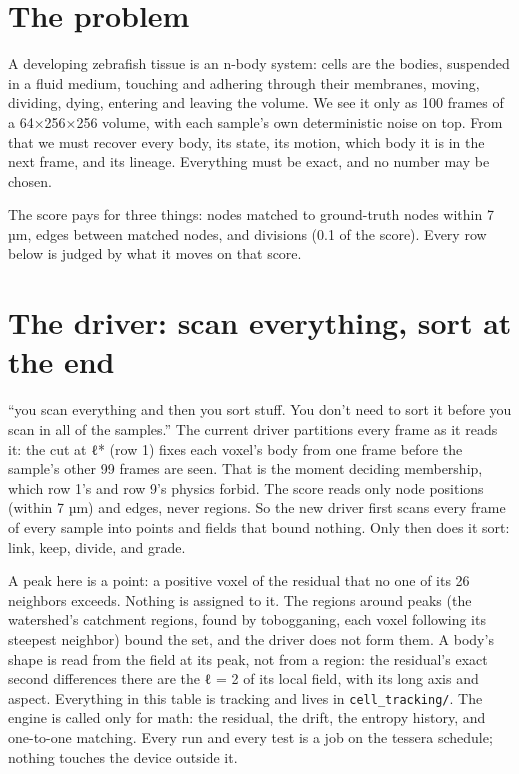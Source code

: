 \section{\texorpdfstring{The problem}{The problem}}

A developing zebrafish tissue is an n-body system: cells are the bodies, suspended in a fluid medium, touching and adhering through their membranes, moving, dividing, dying, entering and leaving the volume. We see it only as 100 frames of a 64×256×256 volume, with each sample's own deterministic noise on top. From that we must recover every body, its state, its motion, which body it is in the next frame, and its lineage. Everything must be exact, and no number may be chosen.

The score pays for three things: nodes matched to ground-truth nodes within 7 µm, edges between matched nodes, and divisions (0.1 of the score). Every row below is judged by what it moves on that score.

\section{\texorpdfstring{The driver: scan everything, sort at the end}{The driver: scan everything, sort at the end}}

“you scan everything and then you sort stuff. You don't need to sort it before you scan in all of the samples.” The current driver partitions every frame as it reads it: the cut at ℓ* (row 1) fixes each voxel's body from one frame before the sample's other 99 frames are seen. That is the moment deciding membership, which row 1's and row 9's physics forbid. The score reads only node positions (within 7 µm) and edges, never regions. So the new driver first scans every frame of every sample into points and fields that bound nothing. Only then does it sort: link, keep, divide, and grade.

A peak here is a point: a positive voxel of the residual that no one of its 26 neighbors exceeds. Nothing is assigned to it. The regions around peaks (the watershed's catchment regions, found by tobogganing, each voxel following its steepest neighbor) bound the set, and the driver does not form them. A body's shape is read from the field at its peak, not from a region: the residual's exact second differences there are the ℓ = 2 of its local field, with its long axis and aspect. Everything in this table is tracking and lives in \texttt{cell\_\allowbreak{}tracking/\allowbreak{}}. The engine is called only for math: the residual, the drift, the entropy history, and one-to-one matching. Every run and every test is a job on the tessera schedule; nothing touches the device outside it.

